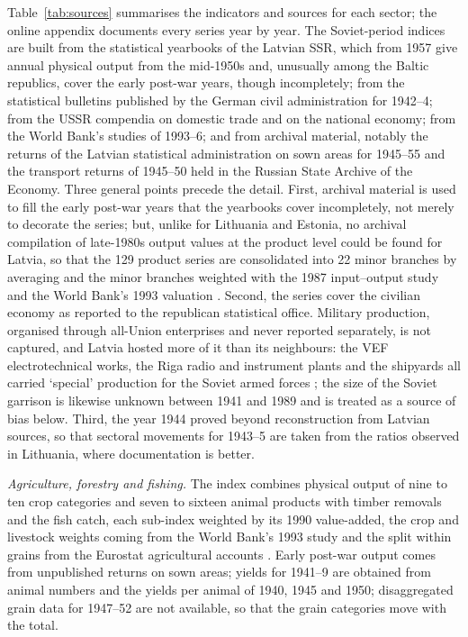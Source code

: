 Table~\ref{tab:sources} summarises the indicators and sources for each sector; the online appendix documents every series year by year. The Soviet-period indices are built from the statistical yearbooks of the Latvian SSR, which from 1957 give annual physical output from the mid-1950s and, unusually among the Baltic republics, cover the early post-war years, though incompletely; from the statistical bulletins published by the German civil administration for 1942--4; from the USSR compendia on domestic trade and on the national economy; from the World Bank's studies of 1993--6; and from archival material, notably the returns of the Latvian statistical administration on sown areas for 1945--55 and the transport returns of 1945--50 held in the Russian State Archive of the Economy. Three general points precede the detail. First, archival material is used to fill the early post-war years that the yearbooks cover incompletely, not merely to decorate the series; but, unlike for Lithuania and Estonia, no archival compilation of late-1980s output values at the product level could be found for Latvia, so that the 129 product series are consolidated into 22 minor branches by averaging and the minor branches weighted with the 1987 input--output study and the World Bank's 1993 valuation \parencites[82--5]{wbinputoutput1987}[289]{wbtransitionlatv}. Second, the series cover the civilian economy as reported to the republican statistical office. Military production, organised through all-Union enterprises and never reported separately, is not captured, and Latvia hosted more of it than its neighbours: the VEF electrotechnical works, the Riga radio and instrument plants and the shipyards all carried `special' production for the Soviet armed forces \parencites[59--61]{upmalis_2015_latvijas}[74--5]{blaubergs_2015_vef}[103--4]{wbtransitionlatv}; the size of the Soviet garrison is likewise unknown between 1941 and 1989 and is treated as a source of bias below. Third, the year 1944 proved beyond reconstruction from Latvian sources, so that sectoral movements for 1943--5 are taken from the ratios observed in Lithuania, where documentation is better.





\textit{Agriculture, forestry and fishing.} The index combines physical output of nine to ten crop categories and seven to sixteen animal products with timber removals and the fish catch, each sub-index weighted by its 1990 value-added, the crop and livestock weights coming from the World Bank's 1993 study and the split within grains from the Eurostat agricultural accounts \parencite[286]{wbtransitionlatv}. Early post-war output comes from unpublished returns on sown areas; yields for 1941--9 are obtained from animal numbers and the yields per animal of 1940, 1945 and 1950; disaggregated grain data for 1947--52 are not available, so that the grain categories move with the total.

